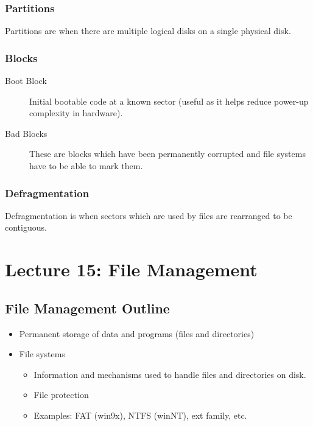 \documentclass{article}%
\begin{document}
\subsubsection{Partitions}
\label{sec:orgd17add0}
Partitions are when there are multiple logical disks on a single physical disk.

\subsubsection{Blocks}
\label{sec:orgbbb8621}
\begin{description}
\item[{Boot Block}] Initial bootable code at a known sector (useful as it helps reduce power-up complexity in hardware).
\item[{Bad Blocks}] These are blocks which have been permanently corrupted and file systems have to be able to mark them.
\end{description}

\subsubsection{Defragmentation}
\label{sec:orgc701b5e}
Defragmentation is when sectors which are used by files are rearranged to be contiguous.

\maketitle
\section{Lecture 15: File Management}


\subsection{File Management Outline}
\label{sec:org6774802}
\begin{itemize}
\item Permanent storage of data and programs (files and directories)
\item File systems
\begin{itemize}
\item Information and mechanisms used to handle files and directories on disk.
\item File protection
\item Examples: FAT (win9x), NTFS (winNT), ext family, etc.
\end{itemize}
\end{itemize}
\end{document}
